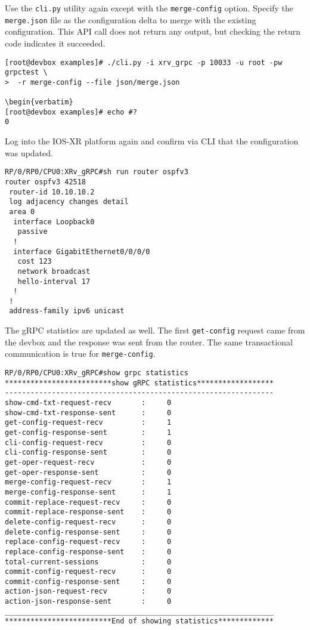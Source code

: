 Use the \verb|cli.py| utility again except with the \verb|merge-config|
option. Specify the \verb|merge.json| file as the configuration delta to merge
with the existing configuration. This API call does not return any output, but
checking the return code indicates it succeeded.

\begin{verbatim}
[root@devbox examples]# ./cli.py -i xrv_grpc -p 10033 -u root -pw grpctest \
>  -r merge-config --file json/merge.json

\begin{verbatim}
[root@devbox examples]# echo #?
0
\end{verbatim}

Log into the IOS-XR platform again and confirm via CLI that the configuration was updated.

\begin{verbatim}
RP/0/RP0/CPU0:XRv_gRPC#sh run router ospfv3
router ospfv3 42518
 router-id 10.10.10.2
 log adjacency changes detail
 area 0
  interface Loopback0
   passive
  !
  interface GigabitEthernet0/0/0/0
   cost 123
   network broadcast
   hello-interval 17
  !
 !
 address-family ipv6 unicast
\end{verbatim}

The gRPC statistics are updated as well. The first \verb|get-config| request came
from the devbox and the response was sent from the router. The same
transactional communication is true for \verb|merge-config|.

\begin{verbatim}
RP/0/RP0/CPU0:XRv_gRPC#show grpc statistics 
*************************show gRPC statistics******************
---------------------------------------------------------------
show-cmd-txt-request-recv       :     0
show-cmd-txt-response-sent      :     0
get-config-request-recv         :     1
get-config-response-sent        :     1
cli-config-request-recv         :     0
cli-config-response-sent        :     0
get-oper-request-recv           :     0
get-oper-response-sent          :     0
merge-config-request-recv       :     1
merge-config-response-sent      :     1
commit-replace-request-recv     :     0
commit-replace-response-sent    :     0
delete-config-request-recv      :     0
delete-config-response-sent     :     0
replace-config-request-recv     :     0
replace-config-response-sent    :     0
total-current-sessions          :     0
commit-config-request-recv      :     0
commit-config-response-sent     :     0
action-json-request-recv        :     0
action-json-response-sent       :     0
_______________________________________________________________
*************************End of showing statistics*************
\end{verbatim}

